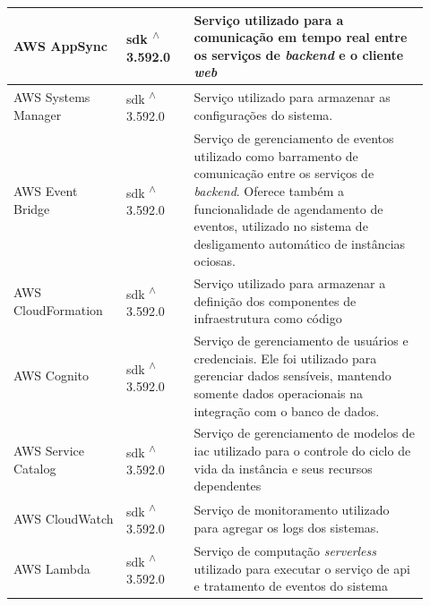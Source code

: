 \begin{longtable}{p{0.25\linewidth} p{0.15\linewidth} p{0.525\linewidth}}
\hline

AWS AppSync \citep{awsappsync} & \gls{sdk} \textsuperscript{$\wedge$}3.592.0 & Serviço utilizado para a comunicação em tempo real entre os serviços de \textit{backend} e o cliente \textit{web} \\

\hline

AWS Systems Manager \citep{awssystemsmanagerdocs} & \gls{sdk} \textsuperscript{$\wedge$}3.592.0 & Serviço utilizado para armazenar as configurações do sistema. \\

\hline

AWS Event Bridge \citep{awseventbridgedocs} & \gls{sdk} \textsuperscript{$\wedge$}3.592.0 & Serviço de gerenciamento de eventos utilizado como barramento de comunicação entre os serviços de \textit{backend}. Oferece também a funcionalidade de agendamento de eventos, utilizado no sistema de desligamento automático de instâncias ociosas. \\

\hline

AWS CloudFormation \citep{awscloudformationdocs} & \gls{sdk} \textsuperscript{$\wedge$}3.592.0 & Serviço utilizado para armazenar a definição dos componentes de infraestrutura como código \\

\hline

AWS Cognito \citep{awscognito} & \gls{sdk} \textsuperscript{$\wedge$}3.592.0 & Serviço de gerenciamento de usuários e credenciais. Ele foi utilizado para gerenciar dados sensíveis, mantendo somente dados operacionais na integração com o banco de dados. \\

\hline

AWS Service Catalog \citep{awsservicecatalogdocs} & \gls{sdk} \textsuperscript{$\wedge$}3.592.0 & Serviço de gerenciamento de modelos de \gls{iac} utilizado para o controle do ciclo de vida da instância e seus recursos dependentes \\

\hline

AWS CloudWatch \citep{awscloudwatchdocs} & \gls{sdk} \textsuperscript{$\wedge$}3.592.0 & Serviço de monitoramento utilizado para agregar os logs dos sistemas. \\

\hline

AWS Lambda \citep{awslambdadocs} & \gls{sdk} \textsuperscript{$\wedge$}3.592.0 & Serviço de computação \textit{serverless} utilizado para executar o serviço de \gls{api} e tratamento de eventos do sistema \\


\end{longtable}
